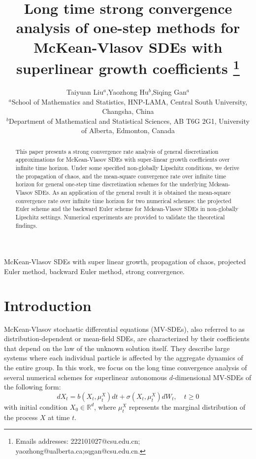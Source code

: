 \documentclass[12pt]{article}
\providecommand{\keywords}[1]{\textbf{\text{Keywords: }} #1}
\numberwithin{equation}{section}
\begin{document}
\title{Long time strong convergence analysis of one-step methods for McKean-Vlasov SDEs with superlinear growth coefficients \thanks{
Emails addresses: 222101027@csu.edu.cn; yaozhong@ualberta.ca;sqgan@csu.edu.cn.}}
\author{\normalsize Taiyuan Liu$^{a}$,\quad Yaozhong Hu$^{b}$,\quad Siqing Gan$^{a}$%
\\
\footnotesize $^{a}$School of Mathematics and Statistics, HNP-LAMA, Central South University, Changsha, China
\\
\footnotesize $^{b}$Department of Mathematical and Statistical Sciences, AB T6G 2G1, University of Alberta, Edmonton, Canada
}
  


\maketitle

\begin{abstract}
    This paper presents a strong convergence rate  analysis of general discretization  approximations for McKean-Vlasov SDEs with  super-linear growth    coefficients over infinite time horizon. Under some specified non-globally Lipschitz conditions,  we derive the propagation of chaos,  and the  mean-square convergence rate  over infinite time horizon   for general one-step time discretization schemes for the underlying Mckean-Vlasov SDEs. As an application of the general result  it is  obtained  the  mean-square convergence rate over infinite time horizon for  two numerical schemes: the projected Euler scheme and the backward Euler scheme for Mckean-Vlasov SDEs in non-globally Lipschitz settings. Numerical experiments  are   provided to validate the  theoretical findings.
\end{abstract}

\keywords{McKean-Vlasov SDEs with super linear
growth, propagation of chaos,  projected
Euler method, backward Euler method, strong convergence.}

\section{Introduction}\label{2023SIS-section:Introduction}

McKean-Vlasov stochastic differential equations (MV-SDEs), also referred to as distribution-dependent or mean-field SDEs, are characterized by their coefficients that depend on the law of the unknown  solution itself. They  describe large systems where each individual particle  is affected by the aggregate dynamics of the entire group.   
In this work, we focus on the long time convergence analysis of several numerical schemes   for  superlinear 
autonomous $d$-dimensional MV-SDEs of the following form:
\begin{equation}\tag{1.1}\label{1.1}
d X_t=b\left(X_t, \mu_{t}^{X}\right) d t+\sigma\left(X_t, \mu_{t}^{X}\right) d W_t, \quad  t\geq 0
\end{equation}
with initial condition $X_0 \in \mathbb{R}^d$, where $\mu_t^X$ represents the marginal distribution of the process $X$ at time $t$.
 
\end{document}

